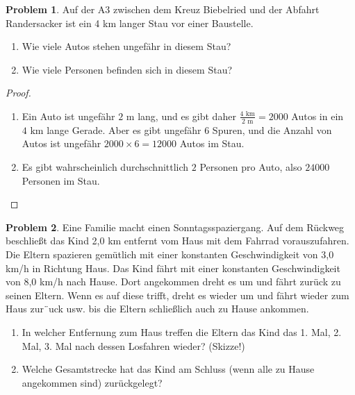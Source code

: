 \documentclass[prb,12pt]{revtex4-2}
\theoremstyle{definition}
\newtheorem{Problem}{Problem}
\theoremstyle{definition}
\newenvironment{parts}{\begin{enumerate}[label=(\alph*)]}{\end{enumerate}}
\begin{document}
\begin{Problem}
	Auf der A3 zwischen dem Kreuz Biebelried und der Abfahrt Randersacker ist ein 4 km langer Stau vor einer Baustelle.
	\begin{parts}
	\item Wie viele Autos stehen ungef\"{a}hr in diesem Stau?	
	\item Wie viele Personen befinden sich in diesem Stau?
	\end{parts}
\end{Problem}
\begin{proof}
	\begin{parts}
	\item Ein Auto ist ungef\"{a}hr $2$ m lang, und es gibt daher $\frac{4\text{ km}}{2\text{ m}}=2000$ Autos in ein $4\text{ km}$ lange Gerade. Aber es gibt ungef\"{a}hr 6 Spuren, und die Anzahl von Autos ist ungef\"{a}hr $2000\times 6 = 12000$ Autos im Stau.
	\item Es gibt wahrscheinlich durchschnittlich $2$ Personen pro Auto, also $24000$ Personen im Stau. \qedhere
	\end{parts}
\end{proof}
\begin{Problem}
	Eine Familie macht einen Sonntagsspaziergang. Auf dem R\"{u}ckweg beschließt das Kind 2,0 km entfernt vom Haus mit dem Fahrrad vorauszufahren. Die Eltern spazieren gem\"{u}tlich mit einer konstanten Geschwindigkeit von 3,0 km/h in Richtung Haus. Das Kind f\"{a}hrt mit einer konstanten Geschwindigkeit von 8,0 km/h nach Hause. Dort angekommen dreht es um und f\"{a}hrt zur\"{u}ck zu seinen Eltern. Wenn es auf diese trifft, dreht es wieder um und f\"{a}hrt wieder zum Haus zur¨uck usw. bis die Eltern schließlich auch zu Hause ankommen.
	\begin{parts}
	\item In welcher Entfernung zum Haus treffen die Eltern das Kind das 1. Mal, 2. Mal, 3. Mal nach dessen Losfahren wieder? (Skizze!)
	\item Welche Gesamtstrecke hat das Kind am Schluss (wenn alle zu Hause angekommen sind) zur\"{u}ckgelegt?
	\end{parts}
\end{Problem}
\end{document}
